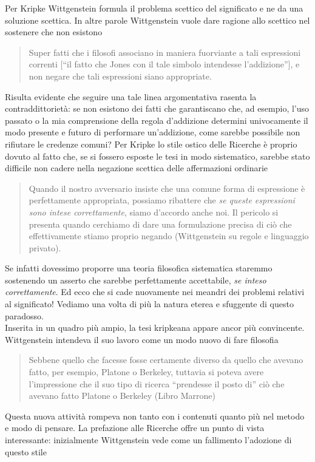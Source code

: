 \documentclass[10pt,a4paper]{article}
\begin{document}
Per Kripke Wittgenstein formula il problema scettico del significato e ne da una soluzione scettica. In altre parole Wittgenstein vuole dare ragione allo scettico nel sostenere che non esistono 
\begin{quote}
	Super fatti  che i filosofi associano in maniera fuorviante a tali espressioni correnti [“il fatto che Jones con il tale simbolo intendesse l’addizione”], e non negare che tali espressioni siano appropriate.
\end{quote}
Risulta evidente che seguire una tale linea argomentativa rasenta la contraddittorietà: se non esistono dei fatti che garantiscano che, ad esempio, l’uso passato o la mia comprensione della regola d’addizione determini univocamente il modo presente e futuro di performare un’addizione, come sarebbe possibile non rifiutare le credenze comuni? Per Kripke lo stile ostico delle Ricerche è proprio dovuto al fatto che, se si fossero esposte le tesi in modo sistematico, sarebbe stato difficile non cadere nella negazione scettica delle affermazioni ordinarie
\begin{quote}
	Quando il nostro avversario insiste che una comune forma di espressione è perfettamente appropriata, possiamo ribattere che \textit{se queste espressioni sono intese correttamente}, siamo d’accordo anche noi. Il pericolo si presenta quando cerchiamo di dare una formulazione precisa di ciò che effettivamente stiamo proprio negando (Wittgenstein su regole e linguaggio privato).
\end{quote} 
Se infatti dovessimo proporre una teoria filosofica sistematica staremmo sostenendo un asserto che sarebbe perfettamente accettabile, \textit{se inteso correttamente}. Ed ecco che si cade nuovamente nei meandri dei problemi relativi al significato! Vediamo una volta di più la natura eterea e sfuggente di questo paradosso.\\
Inserita in un quadro più ampio, la tesi kripkeana appare ancor più convincente. Wittgenstein intendeva il suo lavoro come un modo nuovo di fare filosofia
\begin{quote}
	Sebbene quello che facesse fosse certamente diverso da quello che avevano fatto, per esempio, Platone o Berkeley, tuttavia si poteva avere l’impressione che il suo tipo di ricerca “prendesse il posto di” ciò che avevano fatto Platone o Berkeley (Libro Marrone)
\end{quote}
Questa nuova attività rompeva non tanto con i contenuti quanto più nel metodo e modo di pensare. La prefazione alle Ricerche offre un punto di vista interessante: inizialmente Wittgenstein vede come un fallimento l’adozione di questo stile
\end{document}
